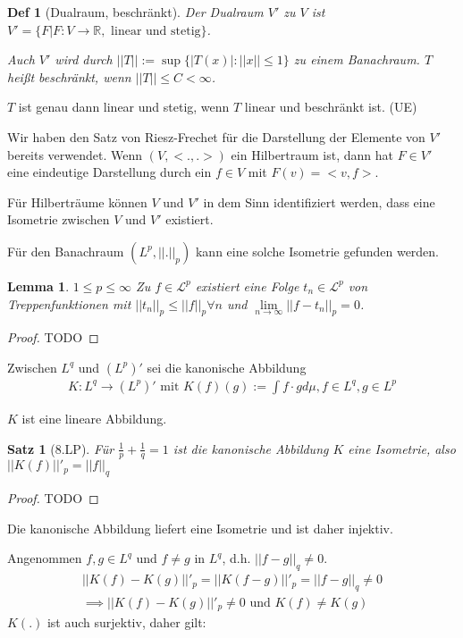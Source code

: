 \documentclass[]{article}
\newtheorem{theorem}{Satz}
\newtheorem{lemma}{Lemma}
\newtheorem*{definition*}{Def}
\begin{document}
\begin{definition*}[Dualraum, beschränkt]
	Der Dualraum $V'$ zu $V$ ist $V'=\{F | F:V\rightarrow\mathbb{R}, \text{ linear und stetig}\}$.
	
	Auch $V'$ wird durch $||T|| := \sup\{|T(x)| : ||x|| \leq 1\}$ zu einem Banachraum. $T$ heißt beschränkt, wenn $||T|| \leq C < \infty$.
\end{definition*}

$T$ ist genau dann linear und stetig, wenn $T$ linear und beschränkt ist. (UE)

Wir haben den Satz von Riesz-Frechet für die Darstellung der Elemente von $V'$ bereits verwendet. Wenn $(V,<.,.>)$ ein Hilbertraum ist, dann hat $F\in V'$ eine eindeutige Darstellung durch ein $f\in V$ mit $F(v) = <v,f>$.

Für Hilberträume können $V$ und $V'$ in dem Sinn identifiziert werden, dass eine Isometrie zwischen $V$ und $V'$ existiert.

Für den Banachraum $(L^p, ||.||_p)$ kann eine solche Isometrie gefunden werden.

\begin{lemma}
	$1 \leq p \leq \infty$ Zu $f\in \mathcal{L}^p$ existiert eine Folge $t_n \in \mathcal{L}^p$ von Treppenfunktionen mit $||t_n||_p \leq ||f||_p \forall n$ und $\lim\limits_{n\rightarrow\infty}||f-t_n||_p = 0$.
\end{lemma}
\begin{proof}
	TODO
\end{proof}

Zwischen $L^q$ und $(L^p)'$ sei die kanonische Abbildung
\begin{align*}
	K:L^q \rightarrow (L^p)' \text{ mit } K(f)(g) := \int f\cdot g d\mu, f\in L^q, g \in L^p
\end{align*}

$K$ ist eine lineare Abbildung.

\begin{theorem}[8.LP]
	Für $\frac{1}{p} + \frac{1}{q} = 1$ ist die kanonische Abbildung $K$ eine Isometrie, also $||K(f)||'_p = ||f||_q$
\end{theorem}

\begin{proof}
	TODO
\end{proof}

Die kanonische Abbildung liefert eine Isometrie und ist daher injektiv.

Angenommen $f,g \in L^q$ und $f\neq g$ in $L^q$, d.h. $||f-g||_q \neq 0$.
\begin{align*}
	||K(f)-K(g)||'_p = ||K(f-g)||'_p = ||f-g||_q \neq 0\\
	\implies ||K(f)-K(g)||'_p \neq 0 \text{ und } K(f) \neq K(g)
\end{align*}
$K(.)$ ist auch surjektiv, daher gilt:
\end{document}
